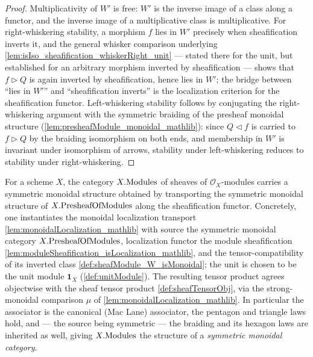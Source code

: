 \begin{proof}
  \leanok
  Multiplicativity of \(W'\) is free: \(W'\) is the inverse image of a class along
  a functor, and the inverse image of a multiplicative class is multiplicative.
  For right-whiskering stability, a morphism \(f\) lies in \(W'\) precisely when
  sheafification inverts it, and the general whisker comparison underlying
  \cref{lem:isIso_sheafification_whiskerRight_unit} --- stated there for the unit,
  but established for an arbitrary morphism inverted by sheafification --- shows
  that \(f \rhd Q\) is again inverted by sheafification, hence lies in \(W'\); the
  bridge between ``lies in \(W'\)'' and ``sheafification inverts'' is the
  localization criterion for the sheafification functor. Left-whiskering stability
  follows by conjugating the right-whiskering argument with the symmetric braiding of
  the presheaf monoidal structure (\cref{lem:presheafModule_monoidal_mathlib}):
  since \(Q \lhd f\) is carried to \(f \rhd Q\) by the braiding isomorphism on
  both ends, and membership in \(W'\) is invariant under isomorphism of arrows,
  stability under left-whiskering reduces to stability under right-whiskering.
\end{proof}

\begin{definition}

  \label{def:sheafModule_monoidalStructure}
  For a scheme \(X\), the category \(X.\mathrm{Modules}\) of sheaves of
  \(\mathcal{O}_X\)-modules carries a symmetric monoidal structure obtained by
  transporting the symmetric monoidal structure of \(X.\mathrm{PresheafOfModules}\) along the
  sheafification functor. Concretely, one instantiates the monoidal localization
  transport \cref{lem:monoidalLocalization_mathlib} with source the symmetric
  monoidal category \(X.\mathrm{PresheafOfModules}\), localization functor the module sheafification
  \cref{lem:moduleSheafification_isLocalization_mathlib}, and the
  tensor-compatibility of its inverted class \cref{def:sheafModule_W_isMonoidal};
  the unit is chosen to be the unit module \(\mathbf{1}_X\) (\cref{def:unitModule}).
  The resulting tensor product agrees objectwise with the sheaf tensor product
  \cref{def:sheafTensorObj}, via the strong-monoidal comparison
  \(\mu\) of \cref{lem:monoidalLocalization_mathlib}. In particular the associator
  is the canonical (Mac Lane) associator, the pentagon and triangle laws hold, and
  --- the source being symmetric --- the braiding and its hexagon laws are
  inherited as well, giving \(X.\mathrm{Modules}\) the structure of a
  \emph{symmetric monoidal category}.
\end{definition}

